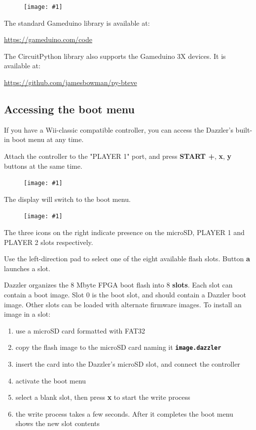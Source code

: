 \documentclass{article}
\newcommand{\pngw}[2]{
\begin{figure}[H]
\begin{center}
\texttt{[image: \#1]}
\end{center}
\end{figure}
}
\newcommand{\mach}[1]{\texttt{\textbf{#1}}}
\begin{document}
\pngw{img/gameduino-3x-dazzler/helloworld}{1.0}

The standard Gameduino library is available at:

\url{https://gameduino.com/code}

The CircuitPython library also supports the Gameduino 3X devices.
It is available at:

\url{https://github.com/jamesbowman/py-bteve}

\newpage
\subsection{Accessing the boot menu}\label{sec:bootmenu}

If you have a Wii-classic compatible controller,
you can access the Dazzler's built-in boot menu at any time.

Attach the controller to the "PLAYER 1" port, and press
\textbf{START +},
\textbf{x},
\textbf{y} buttons at the same time.

\pngw{img/gameduino-3x-dazzler/wii-bootmenu.png}{0.5}

The display will switch to the boot menu.

\pngw{img/gameduino-3x-dazzler/bootmenu1.png}{0.7}

The three icons on the right indicate presence on the
microSD, PLAYER 1 and PLAYER 2 slots respectively.

Use the left-direction pad to select one of the eight available flash slots.
Button \textbf{a} launches a slot.

Dazzler organizes the 8 Mbyte FPGA boot flash into 8 \textbf{slots}.
Each slot can contain a boot image.
Slot 0 is the boot slot, and should contain a Dazzler boot image. Other slots can be loaded with alternate firmware images.
To install an image in a slot: 
\begin{enumerate}

\item use a microSD card formatted with FAT32

\item copy the flash image to the microSD card naming it \mach{image.dazzler}

\item insert the card into the Dazzler's microSD slot, and connect the controller

\item activate the boot menu

\item select a blank slot, then press \textbf{x} to start the write process

\item the write process takes a few seconds.
After it completes the boot menu shows the new slot contents

\end{enumerate}
\end{document}
